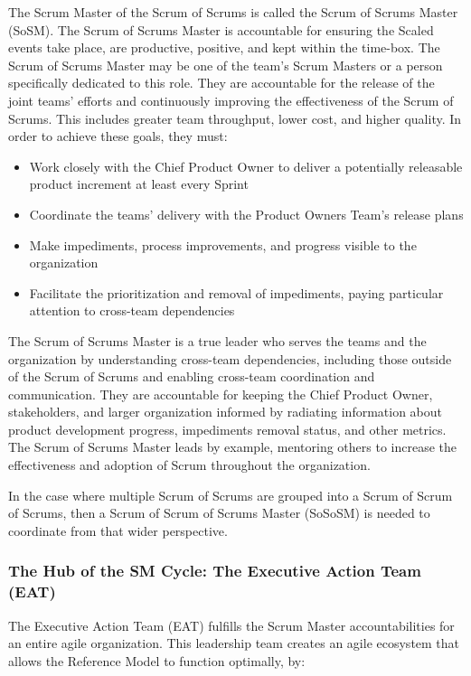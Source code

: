 \documentclass[12pt,a4paper,parskip=full]{scrartcl}
\begin{document}
The Scrum Master of the Scrum of Scrums is called the Scrum of Scrums Master (SoSM). The Scrum of Scrums Master is accountable for ensuring the Scaled events take place, are productive, positive, and kept within the time-box. The Scrum of Scrums Master may be one of the team's Scrum Masters or a person specifically dedicated to this role. They are accountable for the release of the joint teams' efforts and continuously improving the effectiveness of the Scrum of Scrums. This includes greater team throughput, lower cost, and higher quality. In order to achieve these goals, they must:

\begin{itemize}
\itemsep1pt\parskip0pt
\item
  Work closely with the Chief Product Owner to deliver a potentially
  releasable product increment at least every Sprint
\item
  Coordinate the teams' delivery with the Product Owners Team's release
  plans
\item
  Make impediments, process improvements, and progress visible to the
  organization
\item
  Facilitate the prioritization and removal of impediments, paying
  particular attention to cross-team dependencies
\end{itemize}

The Scrum of Scrums Master is a true leader who serves the teams and the organization by understanding cross-team dependencies, including those outside of the Scrum of Scrums and enabling cross-team coordination and communication. They are accountable for keeping the Chief Product Owner, stakeholders, and larger organization informed by radiating information about product development progress, impediments removal status, and other metrics. The Scrum of Scrums Master leads by example, mentoring others to increase the effectiveness and adoption of Scrum throughout the organization.

In the case where multiple Scrum of Scrums are grouped into a Scrum of Scrum of Scrums, then a Scrum of Scrum of Scrums Master (SoSoSM) is needed to coordinate from that wider perspective.


\subsubsection{The Hub of the SM Cycle: The Executive Action Team
(EAT)}\label{the-hub-of-the-sm-cycle}

The Executive Action Team (EAT) fulfills the Scrum Master accountabilities for an entire agile organization. This leadership team creates an agile ecosystem that allows the Reference Model to function optimally, by:
\end{document}
